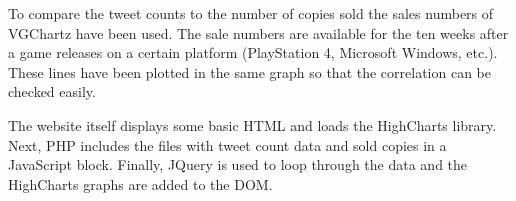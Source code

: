 To compare the tweet counts to the number of copies sold the sales numbers of VGChartz have been used. The sale numbers are available for the ten weeks after a game releases on a certain platform (PlayStation 4, Microsoft Windows, etc.). These lines have been plotted in the same graph so that the correlation can be checked easily.

The website itself displays some basic HTML and loads the HighCharts library. Next, PHP includes the files with tweet count data and sold copies in a JavaScript block. Finally, JQuery is used to loop through the data and the HighCharts graphs are added to the DOM.